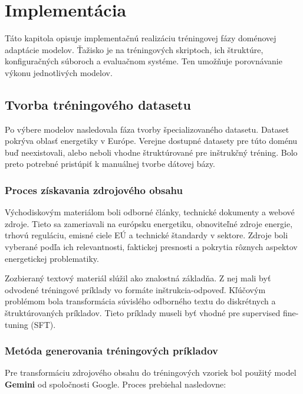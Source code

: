 
\chapter{Implementácia}
\label{ch:implementation}
 
Táto kapitola opisuje implementačnú realizáciu tréningovej fázy doménovej adaptácie modelov. Ťažisko je na tréningových skriptoch, ich štruktúre, konfiguračných súboroch a evaluačnom systéme. Ten umožňuje porovnávanie výkonu jednotlivých modelov.
 
\section{Tvorba tréningového datasetu}
 
Po výbere modelov nasledovala fáza tvorby špecializovaného datasetu. Dataset pokrýva oblasť energetiky v Európe. Verejne dostupné datasety pre túto doménu buď neexistovali, alebo neboli vhodne štruktúrované pre inštrukčný tréning. Bolo preto potrebné pristúpiť k manuálnej tvorbe dátovej bázy.
 
\subsection{Proces získavania zdrojového obsahu}
 
Východiskovým materiálom boli odborné články, technické dokumenty a webové zdroje. Tieto sa zameriavali na európsku energetiku, obnoviteľné zdroje energie, trhovú reguláciu, emisné ciele EÚ a technické štandardy v sektore. Zdroje boli vyberané podľa ich relevantnosti, faktickej presnosti a pokrytia rôznych aspektov energetickej problematiky.
 
Zozbieraný textový materiál slúžil ako znalostná základňa. Z nej mali byť odvodené tréningové príklady vo formáte inštrukcia-odpoveď. Kľúčovým problémom bola transformácia súvislého odborného textu do diskrétnych a štruktúrovaných príkladov. Tieto príklady museli byť vhodné pre supervised fine-tuning (SFT).
 
\subsection{Metóda generovania tréningových príkladov}
 
Pre transformáciu zdrojového obsahu do tréningových vzoriek bol použitý model \textbf{Gemini} od spoločnosti Google. Proces prebiehal nasledovne:
 
